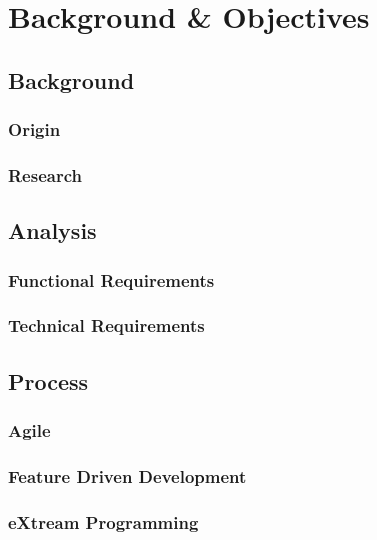 \chapter{Background \& Objectives}


\section{Background}

\subsection{Origin}

\subsection{Research}


\section{Analysis}

\subsection{Functional Requirements}

\subsection{Technical Requirements}


\section{Process}

\subsection{Agile}

\subsection{Feature Driven Development}

\subsection{eXtream Programming}

